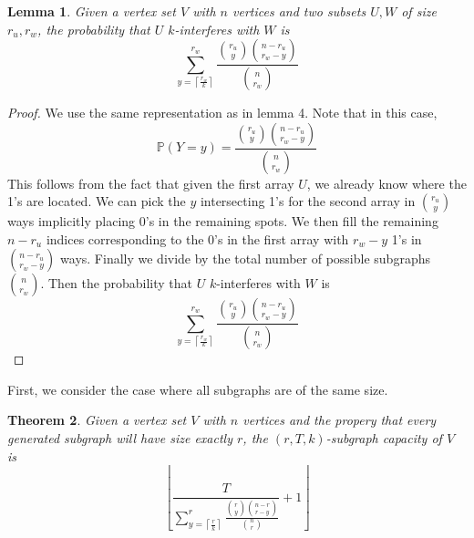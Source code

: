\documentclass[10pt]{extarticle}
\newtheorem{theorem}{Theorem}
\newtheorem{lemma}[theorem]{Lemma}
\theoremstyle{definition}
\begin{document}
\begin{lemma}
    Given a vertex set $V$ with $n$ vertices and two subsets $U,W$ of size $r_u,r_w$, the probability that $U$ $k$-interferes with $W$ is 
    \begin{equation*}
        \sum_{y = \left\lceil \frac{r_w}{k} \right\rceil}^{r_w}  \frac{\binom{r_u}{y} \binom{n-r_u}{r_w-y}}{\binom{n}{r_w}}
    \end{equation*}
\end{lemma}
\begin{proof}
    We use the same representation as in lemma 4. Note that in this case,
    \begin{equation}
        \mathbb{P}(Y=y) = \frac{\binom{r_u}{y} \binom{n-r_u}{r_w-y}}{\binom{n}{r_w}}
    \end{equation}
    This follows from the fact that given the first array $U$, we already know where the 1's are located. We can pick the $y$ intersecting 1's for the second array in $\binom{r_u}{y}$ ways implicitly placing 0's in the remaining spots. We then fill the remaining $n-r_u$ indices corresponding to the 0's in the first array with $r_w-y$ 1's in $\binom{n-r_u}{r_w-y}$ ways. Finally we divide by the total number of possible subgraphs $\binom{n}{r_w}$. 
    Then the probability that $U$ $k$-interferes with $W$ is 
    \begin{equation}
        \sum_{y = \left\lceil \frac{r_w}{k} \right\rceil}^{r_w}  \frac{\binom{r_u}{y} \binom{n-r_u}{r_w-y}}{\binom{n}{r_w}}
    \end{equation}
\end{proof}

First, we consider the case where all subgraphs are of the same size.

\begin{theorem}
    Given a vertex set $V$ with $n$ vertices and the propery that every generated subgraph will have size exactly $r$, the $(r,T,k)$-subgraph capacity of $V$ is 
    \begin{equation*}
        \left\lfloor \frac{T}{\sum_{y = \left\lceil \frac{r}{k} \right\rceil}^{r}  \frac{\binom{r}{y} \binom{n-r}{r-y}}{\binom{n}{r}}} + 1 \right\rfloor
    \end{equation*}
\end{theorem}
\end{document}
